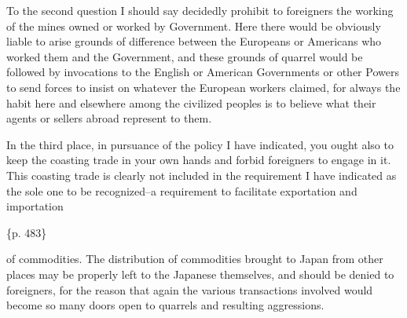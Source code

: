 To the second question I should say decidedly prohibit to foreigners the working of the mines owned or worked by Government. Here there would be obviously liable to arise grounds of difference between the Europeans or Americans who worked them and the Government, and these grounds of quarrel would be followed by invocations to the English or American Governments or other Powers to send forces to insist on whatever the European workers claimed, for always the habit here and elsewhere among the civilized peoples is to believe what their agents or sellers abroad represent to them.

In the third place, in pursuance of the policy I have indicated, you ought also to keep the coasting trade in your own hands and forbid foreigners to engage in it. This coasting trade is clearly not included in the requirement I have indicated as the sole one to be recognized--a requirement to facilitate exportation and importation

\{p. 483\}

of commodities. The distribution of commodities brought to Japan from other places may be properly left to the Japanese themselves, and should be denied to foreigners, for the reason that again the various transactions involved would become so many doors open to quarrels and resulting aggressions.

